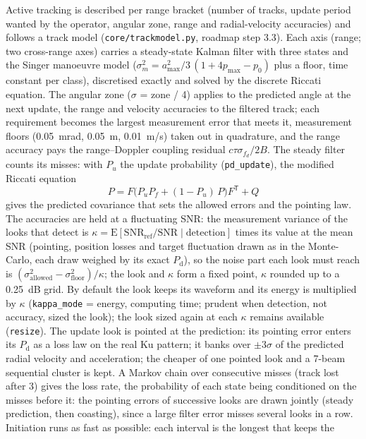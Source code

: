 \documentclass[11pt,a4paper]{article}
\newcommand{\code}[1]{\texttt{\small #1}}
\newcommand{\Pd}{P_{\mathrm d}}
\begin{document}
Active tracking is described per range bracket (number of tracks, update period wanted by the operator, angular
zone, range and radial-velocity accuracies) and follows a track model (\code{core/trackmodel.py}, roadmap step 3.3).
Each axis (range; two cross-range axes) carries a steady-state Kalman filter with three states and the Singer
manoeuvre model ($\sigma_m^2 = a_{\max}^2/3\,(1 + 4p_{\max} - p_0)$ plus a floor, time constant per class), discretised
exactly and solved by the discrete Riccati equation. The angular zone ($\sigma$ = zone / 4) applies to the predicted
angle at the next update, the range and velocity accuracies to the filtered track; each requirement becomes the
largest measurement error that meets it, measurement floors (\SI{0.05}{mrad}, \SI{0.05}{m}, \SI{0.01}{m/s}) taken out in
quadrature, and the range accuracy pays the range--Doppler coupling residual $c\tau\sigma_{f_d}/2B$. The steady filter counts its
misses: with $P_u$ the update probability (\code{pd\_update}), the modified Riccati equation
\[
  P = F\bigl(P_u P_f + (1-P_u)\,P\bigr)F^{\mathsf T} + Q
\]
gives the predicted covariance that sets the allowed errors and the pointing law. The accuracies are held at a
fluctuating SNR: the measurement variance of the looks that detect is $\kappa = \mathrm{E}[\mathrm{SNR}_{\mathrm{ref}}/
\mathrm{SNR} \mid \text{detection}]$ times its value at the mean SNR (pointing, position losses and target fluctuation
drawn as in the Monte-Carlo, each draw weighed by its exact $\Pd$), so the noise part each look must reach is
$(\sigma_{\mathrm{allowed}}^2 - \sigma_{\mathrm{floor}}^2)/\kappa$; the look and $\kappa$ form a fixed point, $\kappa$
rounded up to a \SI{0.25}{dB} grid. By default the look keeps its waveform and its energy is multiplied by $\kappa$
(\code{kappa\_mode} = energy, computing time; prudent when detection, not accuracy, sized the look); the look sized
again at each $\kappa$ remains available (\code{resize}). The update look is pointed at the prediction: its pointing error enters its $\Pd$
as a loss law on the real Ku pattern; it banks over $\pm 3\sigma$ of the predicted radial velocity and acceleration;
the cheaper of one pointed look and a 7-beam sequential cluster is kept. A Markov chain over consecutive misses (track
lost after 3) gives the loss rate, the probability of each state being conditioned on the misses before it: the
pointing errors of successive looks are drawn jointly (steady prediction, then coasting), since a large filter error
misses several looks in a row. Initiation runs as fast as possible: each interval is the longest that keeps the
\end{document}
